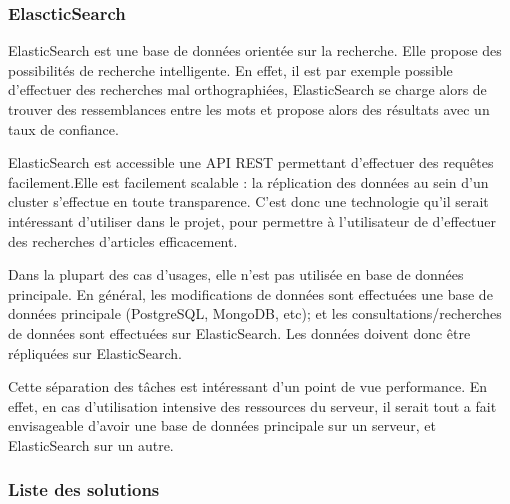     \subsubsection{ElascticSearch}
    \label{subsubsec:elasticsearch}
    ElasticSearch est une base de données orientée sur la recherche.
    Elle propose des possibilités de recherche intelligente. En effet, il est par exemple possible
    d'effectuer des recherches mal orthographiées, ElasticSearch se charge alors de trouver des ressemblances
    entre les mots et propose alors des résultats avec un taux de confiance.

    ElasticSearch est accessible une API REST permettant d'effectuer des requêtes facilement.Elle est facilement scalable :
    la réplication des données au sein d'un cluster s'effectue en toute transparence.
    C'est donc une technologie qu'il serait intéressant d'utiliser dans le projet, pour permettre à l'utilisateur
    de d'effectuer des recherches d'articles efficacement.

    Dans la plupart des cas d'usages, elle n'est pas utilisée en base de données principale. En général,
    les modifications de données sont effectuées une base de données principale (PostgreSQL, MongoDB, etc);
    et les consultations/recherches de données sont effectuées sur ElasticSearch. Les données doivent donc être répliquées sur ElasticSearch.

    Cette séparation des tâches est intéressant d'un point de vue performance. En effet, en cas d'utilisation intensive
    des ressources du serveur, il serait tout a fait envisageable d'avoir une base de données principale sur un serveur,
    et ElasticSearch sur un autre.


        \subsubsection{Liste des solutions}
        \label{subsubsec:bddsolutions}

